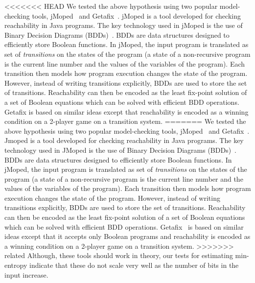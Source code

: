 <<<<<<< HEAD
We tested the above  hypothesis using two popular model-checking tools, jMoped~\cite{Suwimonteerabuth} and Getafix~\cite{Torre}. 
jMoped is a tool developed for checking reachability in Java programs. The key technology used in jMoped is the use of Binary Decision Diagrams (BDDs)~\cite{Lee}. BDDs are data structures designed to efficiently   store Boolean functions. In jMoped, the input program is translated  as set of \emph{transitions} on the states of the program (a state of a non-recursive program is the current line number and the values of the variables of the program). Each transition  then models how program execution changes the state of the program.  However, instead of writing transitions explicitly,
BDDs are used to store the set of transitions.  Reachability can then be encoded as  the least fix-point solution of a set of Boolean equations which can be solved with efficient BDD operations. Getafix is based on similar ideas except that reachability is encoded as a winning condition on a 2-player game on a  transition system. 
=======
We tested the above  hypothesis using two popular model-checking tools, jMoped~\cite{Jmoped} and Getafix~\cite{getafix}. 
Jmoped is a tool developed for checking reachability in Java programs. The key technology used in JMoped is the use of Binary Decision Diagrams (BDDs)~\cite{}. BDDs are data structures designed to efficiently   store Boolean functions. In jMoped, the input program is translated  as set of \emph{transitions} on the states of the program (a state of a non-recursive program is the current line number and the values of the variables of the program). Each transition  then models how program execution changes the state of the program.  However, instead of writing transitions explicitly,
BDDs are used to store the set of transitions.  Reachability can then be encoded as  the least fix-point solution of a set of Boolean equations which can be solved with efficient BDD operations. Getafix~\cite{} is based on similar ideas except that it accepts only Boolean programs and reachability is encoded as a winning condition on a 2-player game on a  transition system. 
>>>>>>> related
Although, these tools should work in theory, our tests for estimating min-entropy indicate that these do not scale very well  as the number of bits in the input increase. 


